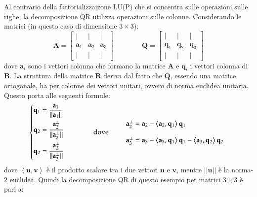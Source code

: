 \documentclass[10pt]{article}
\begin{document}
Al contrario della fattorializzaizone LU(P) che si concentra sulle operazioni sulle righe, la decomposizione QR utilizza operazioni sulle colonne.
Considerando le matrici (in questo caso di dimensione $3\times 3$):
\begin{equation}
\mathbf{A} = 
\begin{bmatrix}
| & | & | \\
\mathbf{a}_1 & \mathbf{a}_2 & \mathbf{a}_3 \\
| & | & |
\end{bmatrix}
\qquad \qquad
\mathbf{Q} = 
\begin{bmatrix}
| & | & | \\
\mathbf{q}_1 & \mathbf{q}_2 & \mathbf{q}_3 \\
| & | & |
\end{bmatrix}
\end{equation}
dove $\mathbf{a}_i$ sono i vettori colonna che formano la matrice $\mathbf{A}$ e $\mathbf{q}_i$ i vettori colonna di $\mathbf{B}$.
La struttura della matrice $\mathbf{R}$ deriva dal fatto che $\mathbf{Q}$, essendo una matrice ortogonale, ha per colonne dei vettori unitari, ovvero di norma euclidea unitaria.
Questo porta alle seguenti formule:
\begin{equation}
\begin{dcases}
\mathbf{q}_1 = \frac{\mathbf{a}_1}{||\mathbf{a}_1||} \\
\mathbf{q}_2 = \frac{\mathbf{a}_2^\perp}{||\mathbf{a}_2^\perp||} \\
\mathbf{q}_2 = \frac{\mathbf{a}_3^\perp}{||\mathbf{a}_3^\perp||}
\end{dcases}
\qquad\qquad \text{dove} \qquad
\begin{array}{l}
\mathbf{a}_2^\perp  = \mathbf{a}_2 - \left<\mathbf{a}_2,\mathbf{q}_1\right> \mathbf{q}_1 \\ \\
\mathbf{a}_3^\perp  = \mathbf{a}_3 - \left<\mathbf{a}_3,\mathbf{q}_1\right> \mathbf{q}_1 - \left<\mathbf{a}_3,\mathbf{q}_2\right> \mathbf{q}_2
\end{array}
\end{equation}
dove $\left<\mathbf{u},\mathbf{v}\right>$ è il prodotto scalare tra i due vettori $\mathbf{u}$ e $\mathbf{v}$, mentre $||\mathbf{u}||$ è la norma-2 euclidea.
Quindi la decomposizione QR di questo esempio per matrici $3\times 3$ è pari a:
\end{document}

